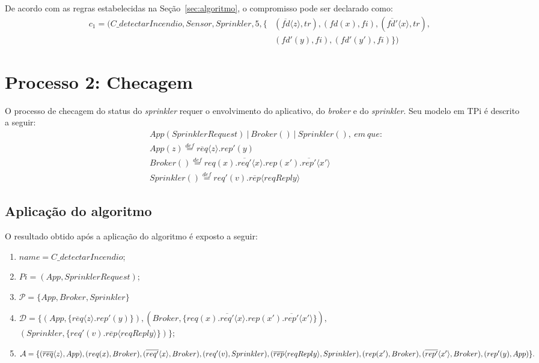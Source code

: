 De acordo com as regras estabelecidas na Seção~\ref{sec:algoritmo}, o compromisso pode ser declarado como:
\begin{eqnarray}
c_{1} = (C\_detectarIncendio, Sensor, Sprinkler, 5, \{&(\overline{fd}\langle z \rangle, tr), (fd(x), fi), (\overline{fd'}\langle x \rangle, tr), & \nonumber \\ &(fd'(y), fi), (fd'(y'), fi) \}) &
\end{eqnarray}

\section{Processo 2: Checagem}

O processo de checagem do status do \textit{sprinkler} requer o envolvimento do aplicativo, do \textit{broker} e do \textit{sprinkler}. Seu modelo em TPi é descrito a seguir:
\begin{align}
& App(SprinklerRequest)~|~Broker()~|~Sprinkler(),~em~que: \nonumber \\
& App(z) \stackrel{def}{=} \overline{req}\langle z \rangle . rep'(y) \nonumber \\
& Broker() \stackrel{def}{=} req(x) . \overline{req'}\langle x \rangle . rep(x') . \overline{rep'}\langle x' \rangle \nonumber \\
& Sprinkler() \stackrel{def}{=} req'(v) . \overline{rep}\langle reqReply \rangle
\end{align}

\subsection*{Aplicação do algoritmo}

O resultado obtido após a aplicação do algoritmo é exposto a seguir:
\begin{enumerate}
	\item $name = C\_detectarIncendio$;
	\item $Pi = (App, SprinklerRequest)$;
	\item $\mathcal{P} = \{App, Broker, Sprinkler\}$
	\item $\mathcal{D} = \{ (App, \{\overline{req}\langle z \rangle . rep'(y)\}), (Broker, \{req(x) . \overline{req'}\langle x \rangle . rep(x') . \overline{rep'}\langle x' \rangle\}),$ 
	\\
	$(Sprinkler, \{req'(v) . \overline{rep}\langle reqReply \rangle\}) \};$
	\item $\mathcal{A} = \{ (\overline{req}\langle z \rangle, App), (req(x), Broker), (\overline{req'}\langle x \rangle, Broker), (req'(v), Sprinkler),
	\\
	(\overline{rep}\langle reqReply \rangle, Sprinkler), (rep(x'), Broker), (\overline{rep'}\langle x' \rangle, Broker), (rep'(y), App) \}.$
\end{enumerate}

